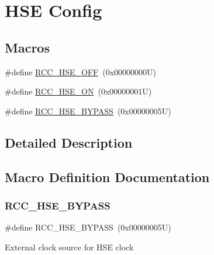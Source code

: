 \hypertarget{group___r_c_c___h_s_e___config}{}\section{H\+SE Config}
\label{group___r_c_c___h_s_e___config}
\subsection*{Macros}
\begin{DoxyCompactItemize}
\item 
\#define \hyperlink{group___r_c_c___h_s_e___config_ga1616626d23fbce440398578855df6f97}{R\+C\+C\+\_\+\+H\+S\+E\+\_\+\+O\+FF}~(0x00000000\+U)
\item 
\#define \hyperlink{group___r_c_c___h_s_e___config_gabc4f70a44776c557af20496b04d9a9db}{R\+C\+C\+\_\+\+H\+S\+E\+\_\+\+ON}~(0x00000001\+U)
\item 
\#define \hyperlink{group___r_c_c___h_s_e___config_ga5ca515db2d5c4d5bdb9ee3d154df2704}{R\+C\+C\+\_\+\+H\+S\+E\+\_\+\+B\+Y\+P\+A\+SS}~(0x00000005\+U)
\end{DoxyCompactItemize}


\subsection{Detailed Description}


\subsection{Macro Definition Documentation}
\mbox{\label{group___r_c_c___h_s_e___config_ga5ca515db2d5c4d5bdb9ee3d154df2704}} 
\subsubsection{\texorpdfstring{R\+C\+C\+\_\+\+H\+S\+E\+\_\+\+B\+Y\+P\+A\+SS}{RCC\_HSE\_BYPASS}}
{\footnotesize\ttfamily \#define R\+C\+C\+\_\+\+H\+S\+E\+\_\+\+B\+Y\+P\+A\+SS~(0x00000005\+U)}

External clock source for H\+SE clock \mbox{\label{group___r_c_c___h_s_e___config_ga1616626d23fbce440398578855df6f97}} 

